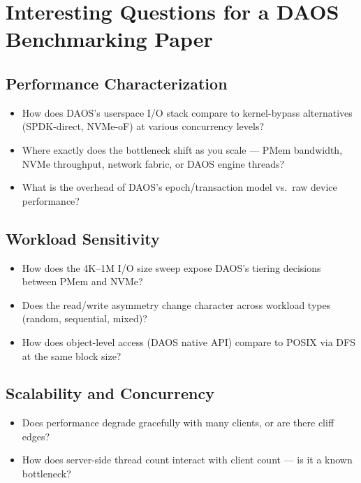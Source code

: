 {\color{orange}

\section*{Interesting Questions for a DAOS Benchmarking Paper}

\subsection*{Performance Characterization}

\begin{itemize}
    \item How does DAOS's userspace I/O stack compare to kernel-bypass alternatives (SPDK-direct, NVMe-oF) at various concurrency levels?
    \item Where exactly does the bottleneck shift as you scale --- PMem bandwidth, NVMe throughput, network fabric, or DAOS engine threads?
    \item What is the overhead of DAOS's epoch/transaction model vs.\ raw device performance?
\end{itemize}

\subsection*{Workload Sensitivity}

\begin{itemize}
    \item How does the 4K--1M I/O size sweep expose DAOS's tiering decisions between PMem and NVMe?
    \item Does the read/write asymmetry change character across workload types (random, sequential, mixed)?
    \item How does object-level access (DAOS native API) compare to POSIX via DFS at the same block size?
\end{itemize}

\subsection*{Scalability and Concurrency}

\begin{itemize}
    \item Does performance degrade gracefully with many clients, or are there cliff edges?
    \item How does server-side thread count interact with client count --- is it a known bottleneck?
\end{itemize}

}
